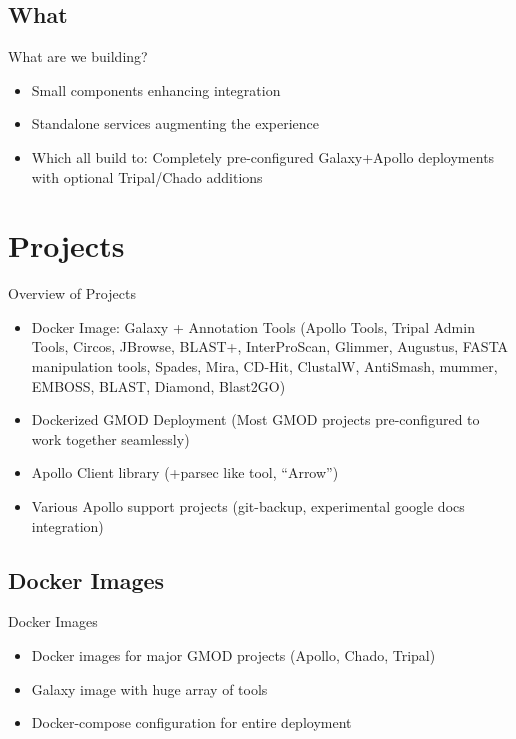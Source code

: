 \documentclass[12pt]{phage3slides} %
\begin{document}
\subsection{What}
\begin{frame}{What are we building?}
    \begin{itemize}
        \item Small components enhancing integration
        \item Standalone services augmenting the experience
        \item Which all build to: Completely pre-configured
            Galaxy+Apollo deployments with optional Tripal/Chado
            additions
    \end{itemize}
\end{frame}

\section{Projects}
\begin{frame}{Overview of Projects}
    \begin{itemize}
        \item Docker Image: Galaxy + Annotation Tools {\color{gray}(Apollo Tools, Tripal Admin Tools, Circos, JBrowse, BLAST+, InterProScan, Glimmer, Augustus, FASTA manipulation tools, Spades, Mira, CD-Hit, ClustalW, AntiSmash, mummer, EMBOSS, BLAST, Diamond, Blast2GO)}
        \item Dockerized GMOD Deployment {\color{gray}(Most GMOD projects pre-configured to work together seamlessly)}
        \item Apollo Client library {\color{gray}(+parsec like tool, ``Arrow'')}
        \item Various Apollo support projects {\color{gray}(git-backup, experimental google docs integration)}
    \end{itemize}
\end{frame}


\subsection{Docker Images}
\begin{frame}{Docker Images}
    \begin{itemize}
        \item Docker images for major GMOD projects (Apollo, Chado, Tripal)
        \item Galaxy image with huge array of tools
        \item Docker-compose configuration for entire deployment
    \end{itemize}
\end{frame}
\end{document}
